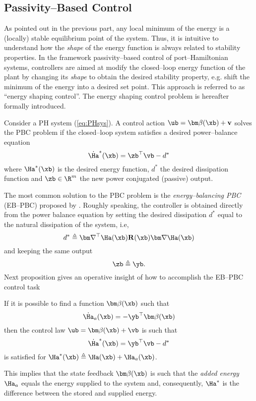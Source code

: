\subsection{Passivity--Based Control}
%
As pointed out in the previous part, any local minimum of the energy is a (locally) stable equilibrium point of the system. Thus, it is intuitive to understand how the \textit{shape} of the energy function is always related to stability properties. 
In the framework passivity--based control of port--Hamiltonian systems, controllers are aimed at modify the closed--loop energy function of the plant by changing its \textit{shape} to obtain the desired stability property, e.g. shift the minimum of the energy into a desired set point. This approach is referred to as ``energy shaping control''. The energy shaping control problem is hereafter formally introduced.
%
\begin{prob}
Consider a PH system (\ref{eq:PHsys}). A control action $\ub = \bm\beta(\xb) + \mathbf{v}$ solves the PBC problem if the closed--loop system satisfies a desired power--balance equation
%
\begin{equation*}
	\dot{\Ha}^*(\xb)
	= \zb^\top \vb - d^*
\end{equation*}
where $\Ha^*(\xb)$ is the desired energy function, $d^*$ the desired dissipation function and $\zb\in\R^m$ the new power conjugated (passive) output.
\end{prob}
%
The most common solution to the PBC problem is the \textit{energy--balancing PBC} (EB--PBC) proposed by \cite{ortega2000}. Roughly speaking, the controller is obtained directly from the power balance equation by setting the desired dissipation $d^*$ equal to the natural dissipation of the system, i.e,
%
\begin{equation}
    d^* \triangleq \bm\nabla^\top\Ha(\xb)\mathbf{R}(\xb)\bm\nabla\Ha(\xb)
\end{equation}
%
and keeping the same output 
%
\begin{equation}
    \zb \triangleq \yb.
\end{equation}
%
Next proposition gives an operative insight of how to accomplish the EB--PBC control task
%
\begin{prop}\label{prop:ebpbc}
If it is possible to find a function $\bm\beta(\xb)$ such that
\begin{equation}
    \dot{\Ha}_a(\xb)
    =-\yb^\top\bm\beta(\xb)
\end{equation}
then the control law $\ub = \bm\beta(\xb)+\vb$ is such that 
\begin{equation}
    \dot{\Ha}^*(\xb)
    = \yb^\top \vb -d^*
\end{equation}
is satisfied for $\Ha^*(\xb) \triangleq \Ha(\xb)+\Ha_a(\xb)$.
\end{prop}
This implies that the state feedback $\bm\beta(\xb)$ is such that the \textit{added energy} $\Ha_a$ equals the energy supplied to the system and, consequently, $\Ha^*$ is the difference between the stored and supplied energy.
%
\newline

